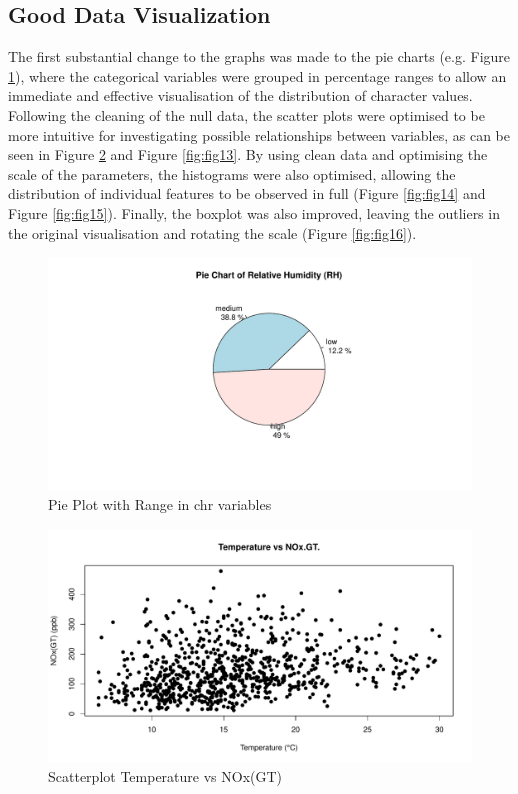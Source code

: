 \documentclass{article}
\begin{document}
\subsection{ Good Data Visualization}
The first substantial change to the graphs was made to the pie charts (e.g. Figure \ref{fig:fig11}), where the categorical variables were grouped in percentage ranges to allow an immediate and effective visualisation of the distribution of character values.
Following the cleaning of the null data, the scatter plots were optimised to be more intuitive for investigating possible relationships between variables, as can be seen in Figure \ref{fig:fig12} and Figure \ref{fig:fig13}. 
By using clean data and optimising the scale of the parameters, the histograms were also optimised, allowing the distribution of individual features to be observed in full (Figure \ref{fig:fig14} and Figure \ref{fig:fig15}).
Finally, the boxplot was also improved, leaving the outliers in the original visualisation and rotating the scale (Figure \ref{fig:fig16}).
\begin{figure}[H]
   \centering
   \includegraphics[width=\linewidth]{images/piechartRHgood.pdf}
   \caption{Pie Plot with Range in chr variables}
   \label{fig:fig11}
\end{figure}
\begin{figure}[H]
   \centering
   \includegraphics[width=\linewidth]{images/1_r.pdf}
   \caption{Scatterplot Temperature vs NOx(GT)}
   \label{fig:fig12}
\end{figure}
\end{document}
